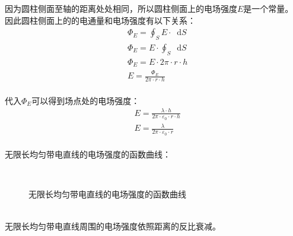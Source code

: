 \documentclass[UTF8]{ctexart}
\newcommand*{\dif}{\mathop{}\!\mathrm{d}}
\begin{document}
    因为圆柱侧面至轴的距离处处相同，所以圆柱侧面上的电场强度$E$是一个常量。\\[3mm]
    因此圆柱侧面上的的电通量和电场强度有以下关系：\vspace{3pt}
    \begin{align}
        &\Phi_E=\oint_S E\cdot\dif S\\[5mm]
        &\Phi_E=E\cdot\oint_S\dif S\\[5mm]
        &\Phi_E=E\cdot 2\pi\cdot r\cdot h\\[5mm]
        &E=\frac{\Phi_E}{2\pi\cdot r\cdot h}
    \end{align}\\
    代入$\Phi_E$可以得到场点处的电场强度：
    \begin{align}
        &E=\frac{\lambda\cdot h}{2\pi\cdot\varepsilon_0\cdot r\cdot h}\\[5mm]
        &E=\frac{\lambda}{2\pi\cdot\varepsilon_0\cdot r}
    \end{align}\\
    无限长均匀带电直线的电场强度的函数曲线：\vspace{3pt}
    \begin{figure}[h]
        \begin{center}
            ~~~~
            \caption{无限长均匀带电直线的电场强度的函数曲线}
        \end{center}
    \end{figure}\\
    无限长均匀带电直线周围的电场强度依照距离的反比衰减。

\newpage
\end{document}
